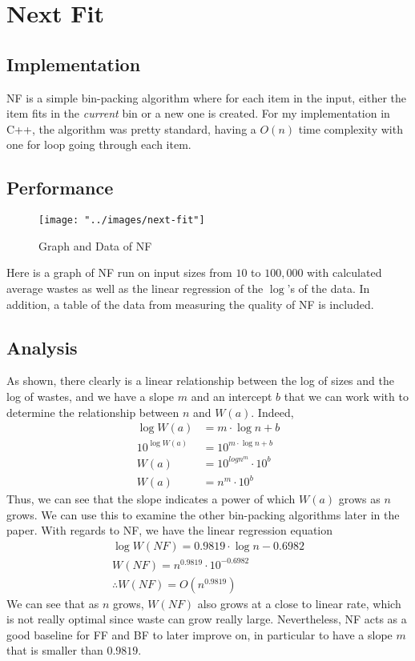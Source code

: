 \documentclass{article}
\begin{document}
\section{Next Fit}
\subsection{Implementation}
    NF is a simple bin-packing algorithm where for each item in the input, 
    either the item fits in the \textit{current} bin or a new one is created. 
    For my implementation in C++, the algorithm was pretty standard, having a
    $O(n)$ time complexity with one for loop going through each item.
\subsection{Performance}
    \begin{figure}[H]
        \centering
        \texttt{[image: "../images/next-fit"]}
        \caption{Graph and Data of NF}
    \end{figure}
    Here is a graph of NF run on input sizes from $10$ to $100,000$ with 
    calculated average wastes as well as the linear regression of the $\log$'s
    of the data. In addition, a table of the data from measuring the quality of
    NF is included.
\subsection{Analysis}
    As shown, there clearly is a linear relationship between the log of sizes
    and the log of wastes, and we have a slope $m$ and an intercept $b$ that we
    can work with to determine the relationship between $n$ and $W(a)$. Indeed,
    \begin{align*}
        \log{W(a)} &= m \cdot \log{n} + b \\
        10^{\log{W(a)}} &= 10^{m \cdot \log{n} + b} \\
        W(a) &= 10^{log{n}^m} \cdot 10^{b} \\
        W(a) &= n^{m} \cdot 10^{b}
    \end{align*}
    \noindent Thus, we can see that the slope indicates a power of which $W(a)$
    grows as $n$ grows. We can use this to examine the other bin-packing
    algorithms later in the paper. 
    \nextblurb
    With regards to NF, we have the linear regression equation 
    \begin{align*}
        \log{W(NF)} = 0.9819 \cdot \log{n} - 0.6982 \\
        W(NF) = n^{0.9819} \cdot 10^{-0.6982} \\
        \therefore \boxed{W(NF) = O\left( n^{0.9819} \right)}
    \end{align*}
    \noindent We can see that as $n$ grows, $W(NF)$ also grows at a close to
    linear rate, which is not really optimal since waste can grow really large.
    Nevertheless, NF acts as a good baseline for FF and BF to later improve on,
    in particular to have a slope $m$ that is smaller than $0.9819$.
\end{document}

